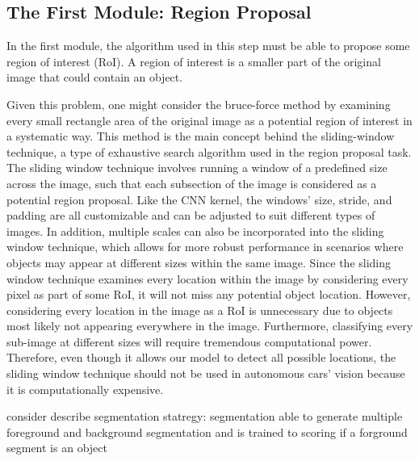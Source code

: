 \subsection{The First Module: Region Proposal}
In the first module, the algorithm used in this step must be able to propose some region of interest (RoI). A region of interest is a smaller part of the original image that could contain an object.

Given this problem, one might consider the bruce-force method by examining every small rectangle area of the original image as a potential region of interest in a systematic way. This method is the main concept behind the sliding-window technique, a type of exhaustive search algorithm used in the region proposal task. The sliding window technique involves running a window of a predefined size across the image, such that each subsection of the image is considered as a potential region proposal. Like the CNN kernel, the windows' size, stride, and padding are all customizable and can be adjusted to suit different types of images. In addition, multiple scales can also be incorporated into the sliding window technique, which allows for more robust performance in scenarios where objects may appear at different sizes within the same image. Since the sliding window technique examines every location within the image by considering every pixel as part of some RoI, it will not miss any potential object location. However, considering every location in the image as a RoI is unnecessary due to objects most likely not appearing everywhere in the image. Furthermore, classifying every sub-image at different sizes will require tremendous computational power. Therefore, even though it allows our model to detect all possible locations, the sliding window technique should not be used in autonomous cars' vision because it is computationally expensive.

{\color{red} consider describe segmentation statregy: segmentation able to generate multiple foreground and background segmentation and is trained to scoring if a forground segment is an object}

